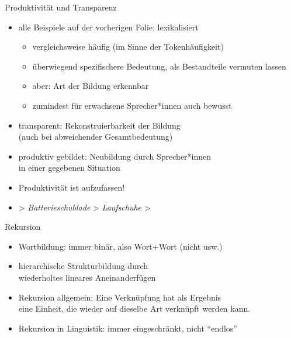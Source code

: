 \begin{frame}
  {Produktivität und Transparenz}
  \pause
  \begin{itemize}[<+->]
    \item \alert{alle} Beispiele auf der vorherigen Folie: \alert{lexikalisiert}
      \begin{itemize}[<+->]
        \item vergleichsweise häufig (im Sinne der Tokenhäufigkeit)
        \item überwiegend spezifischere Bedeutung, als Bestandteile vermuten lassen
        \item aber: Art der Bildung erkennbar
        \item zumindest für erwachsene Sprecher*innen auch bewusst
      \end{itemize}
      \Halbzeile
    \item \alert{transparent}: Rekonstruierbarkeit der Bildung\\
      (auch bei abweichender Gesamtbedeutung)
      \Halbzeile
    \item \alert{produktiv gebildet}: Neubildung durch Sprecher*innen\\
      in einer gegebenen Situation
    \item Produktivität ist  aufzufassen!
    \item {} > \textit{Batterieschublade} > \textit{Laufschuhe} > 
  \end{itemize}
\end{frame}

\begin{frame}[fragile]
  {Rekursion}
  \pause
  \begin{itemize}[<+->]
    \item Wortbildung: immer \alert{binär}, also \alert{Wort+Wort} (nicht  usw.)
      \Viertelzeile
    \item \alert{hierarchische Strukturbildung} durch \\
      wiederholtes lineares Aneinanderfügen
      \Viertelzeile
    \item Rekursion allgemein: \alert{Eine Verknüpfung hat als Ergebnis\\
      eine Einheit, die wieder auf dieselbe Art verknüpft werden kann.}
    \item Rekursion in Linguistik: immer eingeschränkt, nicht "`endlos"'
  \end{itemize}
  \pause
  \begin{center}
    \scalebox{0.7}{
      \begin{forest}
        [Bushaltestellenunterstandsreparatur
          [Bushaltestellenunterstand
            [Bushaltestelle
              [Bus]
              [Haltestelle
                [halten]
                [Stelle]
              ]
            ]
            [Unterstand
              [unter]
              [Stand]
            ]
          ]
          [Reparatur]
        ]
      \end{forest}
    }
  \end{center}
\end{frame}

